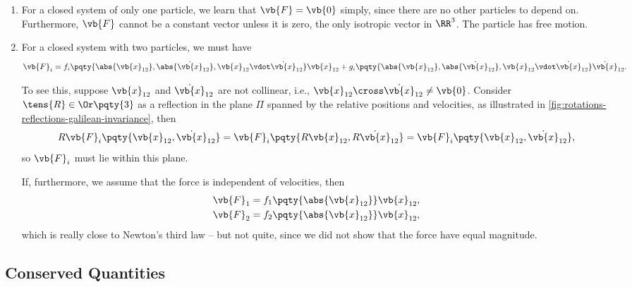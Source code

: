 \begin{example}
    \begin{enumerate}[label=(\roman*)]
        \item For a closed system of only one particle, we learn that \(\vb{F} = \vb{0}\) simply, since there are no other particles to depend on. Furthermore, \(\vb{F}\) cannot be a constant vector unless it is zero, the only isotropic vector in \(\RR^3\). The particle has free motion.
        \item For a closed system with two particles, we must have
        \begin{align*}
            \vb{F}_i = f_i \pqty{\abs{\vb{x}_{12}}, \abs{\dot{\vb{x}}_{12}}, \vb{x}_{12} \vdot \dot{\vb{x}}_{12}} \vb{x}_{12} + g_i \pqty{\abs{\vb{x}_{12}}, \abs{\dot{\vb{x}}_{12}}, \vb{x}_{12} \vdot \dot{\vb{x}}_{12}} \dot{\vb{x}}_{12}.
        \end{align*}

        To see this, suppose \(\vb{x}_{12}\) and \(\dot{\vb{x}}_{12}\) are not collinear, i.e., \(\vb{x}_{12} \cross \dot{\vb{x}}_{12} \neq \vb{0}\). Consider \(\tens{R} \in \Or\pqty{3}\) as a reflection in the plane \(\Pi\) spanned by the relative positions and velocities, as illustrated in \autoref{fig:rotations-reflections-galilean-invariance}, then
        \begin{equation}
            R \vb{F}_i \pqty{\vb{x}_{12}, \dot{\vb{x}}_{12}} = \vb{F}_i \pqty{R\vb{x}_{12}, R\dot{\vb{x}}_{12}} = \vb{F}_i \pqty{\vb{x}_{12}, \dot{\vb{x}}_{12}},
        \end{equation}
        so \(\vb{F}_i\) must lie within this plane.

        If, furthermore, we assume that the force is independent of velocities, then
        \begin{subequations}
            \begin{align}
                \vb{F}_1 = f_{1} \pqty{\abs{\vb{x}_{12}}} \vb{x}_{12}, \\
                \vb{F}_2 = f_{2} \pqty{\abs{\vb{x}_{12}}} \vb{x}_{12},
            \end{align}
        \end{subequations}
        which is really close to Newton's third law -- but not quite, since we did not show that the force have equal magnitude.
    \end{enumerate}
\end{example}

\subsection{Conserved Quantities}
